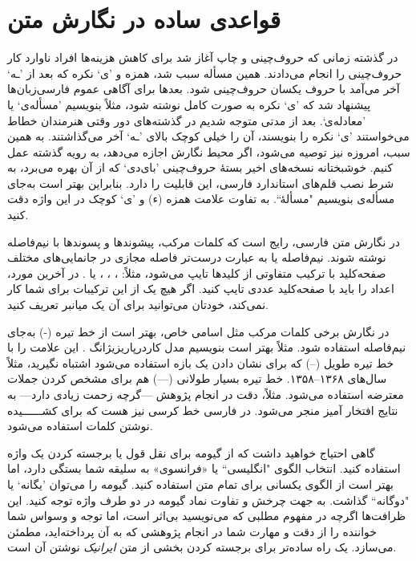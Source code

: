 \section{قواعدی ساده در نگارش متن}
در گذشته زمانی که حروف‌چینی و چاپ آغاز شد برای کاهش هزینه‌ها افراد ناوارد کار حروف‌چینی را انجام می‌دادند. همین مسأله سبب شد، همزه و 'ی` نکره که بعد از 'ـه` آخر می‌آمد با حروف یکسان حروف‌چینی شود. بعدها برای آگاهی عموم فارسی‌زبان‌ها پیشنهاد شد که 'ی` نکره به صورت کامل نوشته شود، مثلاً بنویسیم 'مسأله‌ی` یا 'معادله‌ی`. بعد از مدتی متوجه شدیم در گذشته‌های دور وقتی هنرمندان خطاط می‌خواستند 'ی` نکره را بنویسند، آن را خیلی کوچک بالای 'ـه` آخر می‌گذاشتند.  به همین سبب، امروزه نیز توصیه می‌شود، اگر محیط نگارش اجازه می‌دهد، به رویه گذشته عمل کنیم. خوشبختانه نسخه‌های اخیر بستهٔ حروف‌چینی 'بای‌دی`%
که 
\xepersian 
از آن بهره می‌برد، به شرط نصب قلم‌های استاندارد فارسی، این قابلیت را دارد. بنابراین بهتر است به‌جای مسأله‌ی بنویسیم "مسألهٔ``. به تفاوت علامت همزه (ء) و 'ی` کوچک در این واژه دقت کنید.

در نگارش متن فارسی، رایج است که کلمات مرکب، پیشوندها و پسوندها با نیم‌فاصله نوشته شوند. نیم‌فاصله یا به عبارت درست‌تر فاصله مجازی%
در جانمایی‌های%
مختلف صفحه‌کلید با ترکیب متفاوتی از کلیدها تایپ می‌شود، مثلاً:
، ، ، یا . 
در آخرین مورد، اعداد را باید با صفحه‌کلید عددی%
تایپ کنید. اگر هیچ یک از این ترکیبات برای شما کار نمی‌کند، خودتان می‌توانید برای آن یک میانبر تعریف کنید. 

در نگارش برخی کلمات مرکب مثل اسامی خاص، بهتر است از خط تیره (-) به‌جای نیم‌فاصله استفاده شود. مثلاً بهتر است بنویسیم مدل کاردر\dash پاریزی\dash ژانگ%
. 
این علامت را با خط تیره طویل (--) که برای نشان دادن یک بازه استفاده می‌شود اشتباه نگیرید، مثلاً سال‌های ۱۳۶۸--۱۳۵۸. خط تیره بسیار طولانی (---) هم برای مشخص کردن جملات معترضه استفاده می‌شود. مثلاً، دقت در انجام پژوهش ---گرچه زحمت زیادی دارد--- به نتایج افتخار آمیز منجر می‌شود. در فارسی خط کرسی نیز هست که برای کشــــــیده نوشتن کلمات استفاده می‌شود.

گاهی احتیاج خواهید داشت که از گیومه برای نقل قول یا برجسته کردن یک واژه استفاده کنید. انتخاب الگوی "انگلیسی`` یا «فرانسوی» به سلیقه شما بستگی دارد، اما بهتر است از الگوی یکسانی برای تمام متن استفاده کنید. گیومه را می‌توان 'یگانه` یا "دوگانه`` گذاشت. به جهت چرخش و تفاوت نماد گیومه در دو طرف واژه توجه کنید. این ظرافت‌ها اگرچه در مفهوم مطلبی که می‌نویسید بی‌اثر است، اما توجه و وسواس شما خواننده را از دقت و مهارت شما در انجام پژوهشی که به آن پرداخته‌اید، مطمئن می‌سازد. یک راه ساده‌تر برای برجسته کردن بخشی از متن 
\emph{ایرانیک} 
نوشتن آن است.

